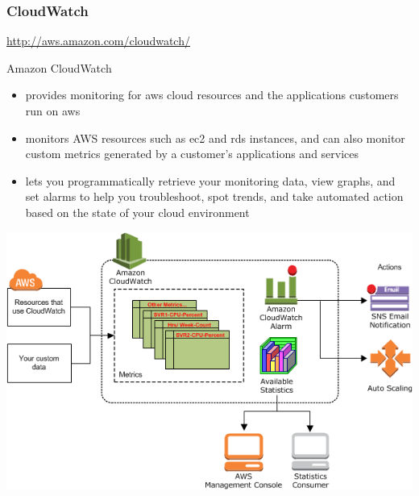 \documentclass{beamer}
\begin{document}
\begin{frame}
\frametitle[CloudWatch]{CloudWatch}
\url{http://aws.amazon.com/cloudwatch/}

Amazon CloudWatch 
\begin{itemize}
\item provides monitoring for \gls{aws} cloud resources and the applications customers run on \gls{aws}
\item monitors AWS resources such as \gls{ec2} and \gls{rds} instances, and can also monitor custom metrics generated by a customer’s applications and services
\item lets you programmatically retrieve your monitoring data, view graphs, and set alarms to help you troubleshoot, spot trends, and take automated action based on the state of your cloud environment
\end{itemize}
\includegraphics[width=1.0 \textwidth]{CW-Overview.png}
\end{frame}
\end{document}
